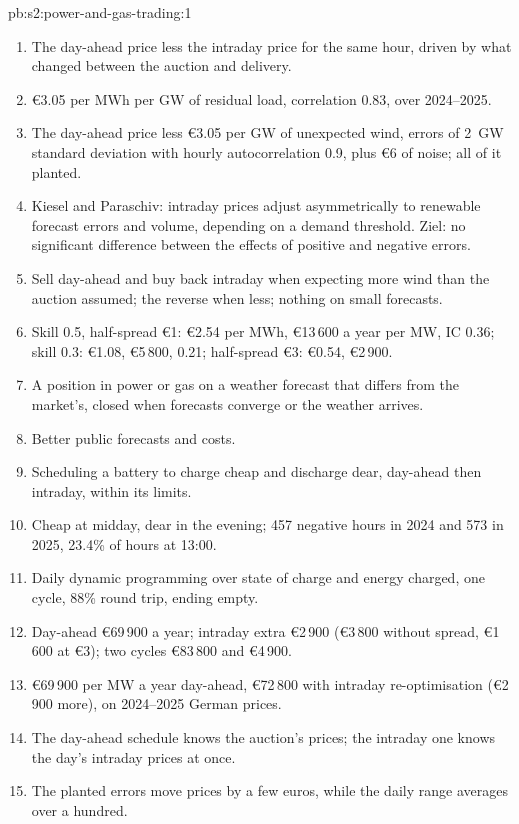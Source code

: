 \begin{solution}{pb:s2:power-and-gas-trading:1}
\begin{enumerate}
\item The day-ahead price less the intraday price for the same hour, driven by what changed between the auction and delivery.
\item \euro3.05 per MWh per GW of residual load, correlation 0.83, over 2024--2025.
\item The day-ahead price less \euro3.05 per GW of unexpected wind, errors of 2~GW standard deviation with hourly autocorrelation 0.9, plus \euro6 of
noise; all of it planted.
\item Kiesel and Paraschiv: intraday prices adjust asymmetrically to renewable forecast errors and volume, depending on a demand threshold. Ziel: no
significant difference between the effects of positive and negative errors.
\item Sell day-ahead and buy back intraday when expecting more wind than the auction assumed; the reverse when less; nothing on small forecasts.
\item Skill 0.5, half-spread \euro1: \euro2.54 per MWh, \euro13\,600 a year per MW, IC 0.36; skill 0.3: \euro1.08, \euro5\,800, 0.21; half-spread
\euro3: \euro0.54, \euro2\,900.
\item A position in power or gas on a weather forecast that differs from the market's, closed when forecasts converge or the weather arrives.
\item Better public forecasts and costs.
\item Scheduling a battery to charge cheap and discharge dear, day-ahead then intraday, within its limits.
\item Cheap at midday, dear in the evening; 457 negative hours in 2024 and 573 in 2025, 23.4\% of hours at 13:00.
\item Daily dynamic programming over state of charge and energy charged, one cycle, 88\% round trip, ending empty.
\item Day-ahead \euro69\,900 a year; intraday extra \euro2\,900 (\euro3\,800 without spread, \euro1\,600 at \euro3); two cycles \euro83\,800 and
\euro4\,900.
\item \euro69\,900 per MW a year day-ahead, \euro72\,800 with intraday re-optimisation (\euro2\,900 more), on 2024--2025 German prices.
\item The day-ahead schedule knows the auction's prices; the intraday one knows the day's intraday prices at once.
\item The planted errors move prices by a few euros, while the daily range averages over a hundred.

\end{enumerate}
\end{solution}
